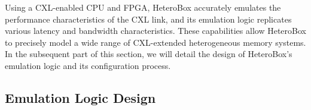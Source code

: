 Using a CXL-enabled CPU and FPGA, HeteroBox accurately emulates the performance characteristics of the CXL link, and its emulation logic replicates various latency and bandwidth characteristics. These capabilities allow HeteroBox to precisely model a wide range of CXL-extended heterogeneous memory systems.
In the subsequent part of this section, we will detail the design of HeteroBox's emulation logic and its configuration process.








\subsection{Emulation Logic Design}
% 


